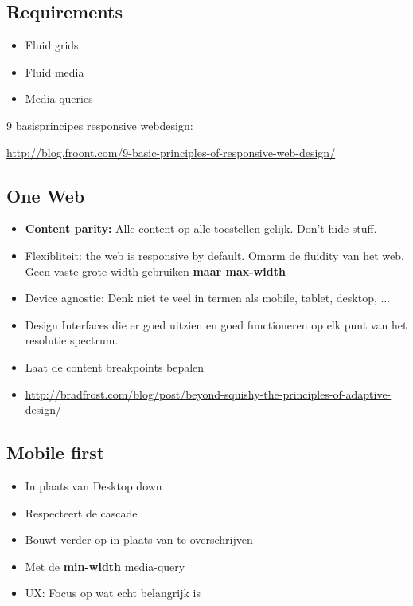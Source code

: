 \documentclass{article}
\newcommand{\bold}[1]{\textbf{#1}}
\begin{document}
\subsection{Requirements}
\begin{itemize}
    \item Fluid grids
    \item Fluid media
    \item Media queries
\end{itemize}

9 basisprincipes responsive webdesign:

\url{http://blog.froont.com/9-basic-principles-of-responsive-web-design/}

\subsection{One Web}
\begin{itemize}
    \item \bold{Content parity:} Alle content op alle toestellen gelijk. Don’t hide stuff.
    \item Flexibliteit: the web is responsive by default. Omarm de fluidity van het web. Geen vaste grote width gebruiken \bold{maar max-width}
    \item Device agnostic: Denk niet te veel in termen als mobile, tablet, desktop, ...
    \item Design Interfaces die er goed uitzien en goed functioneren op elk punt van het resolutie spectrum.
    \item Laat de content breakpoints bepalen
    \item \url{http://bradfrost.com/blog/post/beyond-squishy-the-principles-of-adaptive-design/}
\end{itemize}

\subsection{Mobile first}
\begin{itemize}
    \item In plaats van Desktop down
    \item Respecteert de cascade
    \item Bouwt verder op in plaats van te overschrijven
    \item Met de \bold{min-width} media-query
    \item UX: Focus op wat echt belangrijk is
\end{itemize}
\end{document}
